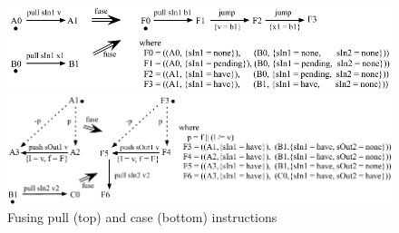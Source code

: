\begin{figure}
\includegraphics[scale=1.1]{figures/fuse-pull-pull.pdf}

\vspace{2em}

\includegraphics[scale=1.1]{figures/fuse-case-pull.pdf}
\caption{Fusing pull (top) and case (bottom) instructions}
\label{fig:Fusion:Pulls}
\label{fig:Fusion:Case}
\end{figure}


